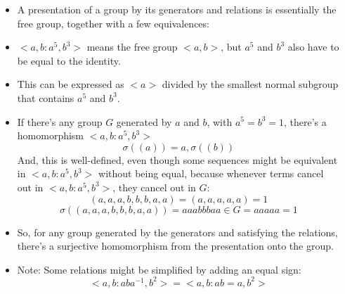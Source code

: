 \documentclass[8pt]{beamer}
\begin{document}
\begin{frame}
\begin{columns}
\begin{column}[T]{0.5\textwidth}
\begin{itemize}
        \end{itemize}
      \end{column}
      \begin{column}[T]{0.5\textwidth}
        \begin{itemize}
          \item A presentation of a group by its generators and relations
            is essentially the free group, together with a few equivalences:
          \item $<a,b:a^5,b^3>$ means the free group $<a,b>$, but $a^5$ and
            $b^3$ also have to be equal to the identity.
          \item This can be expressed as $<a>$ divided by the smallest normal
            subgroup that contains $a^5$ and $b^3$.
          \item If there's any group $G$ generated by $a$ and $b$, with
            $a^5 = b^3 = 1$, there's a homomorphism $<a,b:a^5,b^3>$
            \[\sigma((a)) = a, \sigma((b))\]
            And, this is well-defined, even though some sequences might be
            equivalent in $<a,b:a^5,b^3>$ without being equal, because whenever
            terms cancel out in $<a,b:a^5,b^3>$, they cancel out in $G$:
            \[(a,a,a,b,b,b,a,a) = (a,a,a,a,a) = 1\]
            \[\sigma((a,a,a,b,b,b,a,a)) = aaabbbaa \in G = aaaaa = 1\]
          \item So, for any group generated by the generators and satisfying the
            relations, there's a surjective homomorphism from the presentation
            onto the group.

          \item Note: Some relations might be simplified by adding an equal
            sign:
            \[<a,b:aba^{-1}, b^2> = <a,b:ab = a, b^2>\]
        \end{itemize}
      \end{column}
    \end{columns}
  \end{frame}
\end{document}
